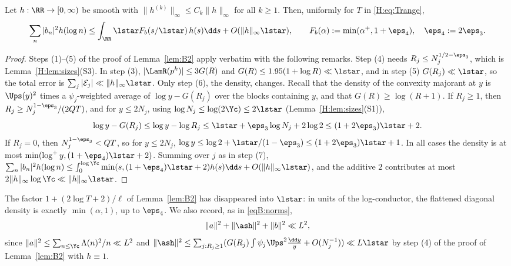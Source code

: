 \begin{lemma}\label{H:lem:B2}
Let $h:\RR\to[0,\infty)$ be smooth with $\|h^{(k)}\|_\infty\le C_k\|h\|_\infty$ for all $k\ge1$. Then, uniformly for $T$ in \eqref{H:eq:Trange},
\[
\sum_n|b_n|^2h(\log n)\le\int_\RR\lstar F_b(s/\lstar)\,h(s)\dd s+O(\|h\|_\infty\lstar),\qquad F_b(\alpha):=\min(\alpha^+,1+\eps_4),\quad\eps_4:=2\eps_3 .
\]
\end{lemma}
\begin{proof}
Steps (1)--(5) of the proof of Lemma~\ref{lem:B2} apply verbatim with the following remarks. Step (4) needs $R_j\le N_j^{1/2-\eps_3}$, which is Lemma~\ref{H:lem:sizes}(S3). In step (3), $|\LamR(p^k)|\le3G(R)$ and $G(R)\le1.95(1+\log R)\ll\lstar$, and in step (5) $G(R_j)\ll\lstar$, so the total error is $\sum_j|\mathcal E_j|\ll\|h\|_\infty\lstar$. Only step (6), the density, changes. Recall that the density of the convexity majorant at $y$ is $\Ups(y)^2$ times a $\psi_j$-weighted average of $\log y-G(R_j)$ over the blocks containing $y$, and that $G(R)\ge\log(R+1)$.
If $R_j\ge1$, then $R_j\ge N_j^{1-\eps_3}/(2QT)$, and for $y\le2N_j$, using $\log N_j\le\log(2\Yc)\le2\lstar$ (Lemma~\ref{H:lem:sizes}(S1)),
\[
\log y-G(R_j)\le\log y-\log R_j\le\lstar+\eps_3\log N_j+2\log2\le(1+2\eps_3)\lstar+2 .
\]
If $R_j=0$, then $N_j^{1-\eps_3}<QT$, so for $y\le2N_j$, $\log y\le\log2+\lstar/(1-\eps_3)\le(1+2\eps_3)\lstar+1$. In all cases the density is at most $\min(\log^+y,(1+\eps_4)\lstar+2)$. Summing over $j$ as in step (7), $\sum_n|b_n|^2h(\log n)\le\int_0^{\log\Yc}\min(s,(1+\eps_4)\lstar+2)h(s)\dd s+O(\|h\|_\infty\lstar)$, and the additive $2$ contributes at most $2\|h\|_\infty\log\Yc\ll\|h\|_\infty\lstar$.
\end{proof}
The factor $1+(2\log T+2)/\ell$ of Lemma~\ref{lem:B2} has disappeared into $\lstar$: in units of the log-conductor, the flattened diagonal density is exactly $\min(\alpha,1)$, up to $\eps_4$. We also record, as in \eqref{eqB:norms},
\begin{equation}\label{H:eq:norms}
\|a\|^2+\|\ash\|^2+\|b\|^2\ll L^2,
\end{equation}
since $\|a\|^2\le\sum_{n\le\Yc}\Lambda(n)^2/n\ll L^2$ and $\|\ash\|^2\le\sum_{j:R_j\ge1}(G(R_j)\int\psi_j\Ups^2\frac{\dd y}y+O(N_j^{-1}))\ll L\lstar$ by step (4) of the proof of Lemma~\ref{lem:B2} with $h\equiv1$.

